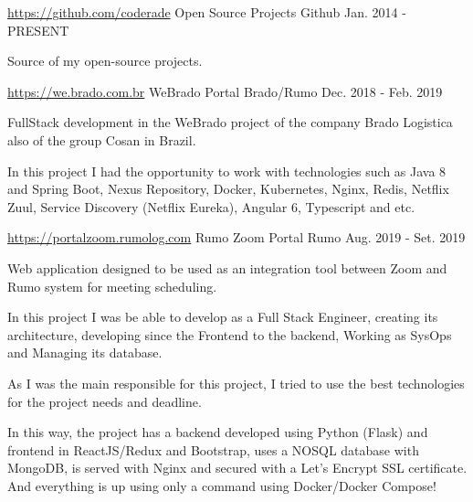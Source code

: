 

\begin{cventries}
  \cventry
    {\hyperref[https://github.com/coderade]{https://github.com/coderade}} %
    {Open Source Projects}%
    {Github} %
    {Jan. 2014 - PRESENT} %
    {
      \begin{cvitems} %
       \item{Source of my open-source projects.}
      \end{cvitems}
    }
\cventry
 {\hyperref[http://we.brado.com.br/v2]{https://we.brado.com.br}} %
{WeBrado Portal }%
{Brado/Rumo} %
{Dec. 2018 - Feb. 2019} %
{
  \begin{cvitems} %
   \item{FullStack development in the WeBrado project of the company Brado Logistica also of the group Cosan in Brazil.}
   \item{In this project I had the opportunity to work with technologies such as Java 8 and Spring Boot, Nexus Repository, Docker, Kubernetes, Nginx, Redis, Netflix Zuul, Service Discovery (Netflix Eureka), Angular 6, Typescript and etc.}
  \end{cvitems}
}
  \cventry
     {\hyperref[https://portalzoom.rumolog.com]{https://portalzoom.rumolog.com}}
    {Rumo Zoom Portal }%
    {Rumo} %
    {Aug. 2019 - Set. 2019} %
    {
      \begin{cvitems} %
       \item{Web application designed to be used as an integration tool between Zoom and Rumo system for meeting scheduling.}
       \item{In this project I was be able to develop as a Full Stack Engineer, creating its architecture, developing since the Frontend to the backend, Working as SysOps and Managing its database.}
        \item{As I was the main responsible for this project, I tried to use the best technologies for the project needs and deadline.}
         \item{In this way, the project has a backend developed using Python (Flask) and frontend in ReactJS/Redux and Bootstrap, uses a NOSQL database with MongoDB, is served with Nginx and secured with a Let’s Encrypt SSL certificate. And everything is up using only a command using Docker/Docker Compose!}
      \end{cvitems}
    }


\end{cventries}
